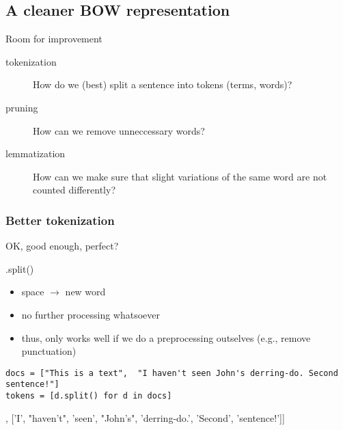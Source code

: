 

\subsection{A cleaner BOW representation}

\begin{frame}{Room for improvement}
\begin{description}
	\item[tokenization] How do we (best) split a sentence into tokens (terms, words)?
	\item[pruning] How can we remove unneccessary words?
	\item[lemmatization] How can we make sure that slight variations of the same word are not counted differently?

\end{description}
\end{frame}

\subsubsection{Better tokenization}

\begin{frame}[fragile]{OK, good enough, perfect?}
\begin{block}{.split()}
\begin{itemize}
	\item space $\rightarrow$ new word
	\item no further processing whatsoever
	\item thus, only works well if we do a preprocessing outselves (e.g., remove punctuation)
\end{itemize}
\end{block}
\begin{lstlisting}
docs = ["This is a text",  "I haven't seen John's derring-do. Second sentence!"]
tokens = [d.split() for d in docs]
\end{lstlisting}
\begin{lstlistingoutputtiny}
[['This', 'is', 'a', 'text'], ['I', "haven't", 'seen', "John's", 'derring-do.', 'Second', 'sentence!']]
\end{lstlistingoutputtiny}
\end{frame}


